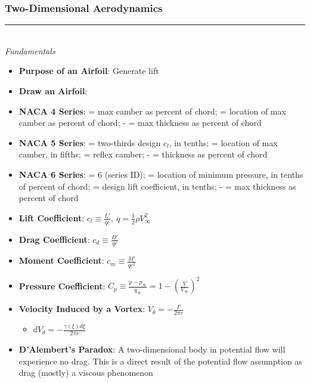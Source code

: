 \documentclass[12pt]{article}
\newcommand{\Item}[1]{\item \textbf{#1}:}
\newcommand{\Header}[1]{\noindent\rule{\textwidth}{0.4pt}\\\large{\textit{#1}}\normalsize{}}
\newcommand{\Vinfty}{V_\infty}
\newcommand{\qinfty}{q_\infty}
\begin{document}
\subsubsection{Two-Dimensional Aerodynamics}
\Header{Fundamentals}
\begin{itemize}
\Item{Purpose of an Airfoil} Generate lift
\Item{Draw an Airfoil}
\Item{NACA 4 Series}  = max camber as percent of chord;  = location of max camber as percent of chord; - = max thickness as percent of chord
\Item{NACA 5 Series}  = two-thirds design $c_l$, in tenths;  = location of max camber, in fifths;  = reflex camber; - = thickness as percent of chord
\Item{NACA 6 Series}  = 6 (series ID);  = location of minimum pressure, in tenths of percent of chord;  = design lift coefficient, in tenths; - = max thickness as percent of chord
\Item{Lift Coefficient} $c_l \equiv \frac{L'}{qc},\ q = \frac{1}{2}\rho \Vinfty^2$
\Item{Drag Coefficient} $c_d \equiv \frac{D'}{qc}$
\Item{Moment Coefficient} $c_m \equiv \frac{M'}{qc^2}$
\Item{Pressure Coefficient} $C_p \equiv \frac{p-p_\infty}{\qinfty} = 1-\left(\frac{V}{\Vinfty}\right)^2$
\Item{Velocity Induced by a Vortex} $V_\theta = -\frac{\Gamma}{2\pi r}$
	\begin{itemize}
	\item $dV_\theta = -\frac{\gamma(\xi)d\xi}{2\pi r}$
	\end{itemize}
\Item{D'Alembert's Paradox} A two-dimensional body in potential flow will experience no drag. This is a direct result of the potential flow assumption as drag (mostly) a viscous phenomenon
\end{itemize}
\end{document}
